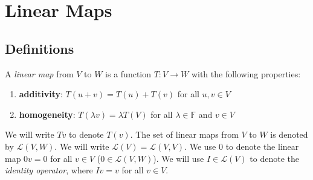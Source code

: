\documentclass{article}
\begin{document}
\section{Linear Maps}

\subsection{Definitions}

\begin{definition}
  \label{def:linear-map}
  A \textit{linear map} from $V$ to $W$ is a function $T: V
  \rightarrow W$ with the following properties:
  \begin{enumerate}
  \item \textbf{additivity}: $T(u + v) = T(u) + T(v)$ for all $u, v
    \in V$
  \item \textbf{homogeneity}: $T(\lambda v) = \lambda T(V)$ for all
    $\lambda \in \mathbb{F}$ and $v \in V$
  \end{enumerate}
  We will write $Tv$ to denote $T(v)$. The set of linear maps from $V$
  to $W$ is denoted by $\mathcal{L}(V, W)$. We will write
  $\mathcal{L}(V) = \mathcal{L}(V, V)$.
  We use $0$ to denote the linear map $0v = 0$ for all $v \in V$ ($0
  \in \mathcal{L}(V, W)$). We will use $I \in \mathcal{L}(V)$ to denote the
  \textit{identity operator}, where $Iv = v$ for all $v \in V$.
\end{definition}
\end{document}
